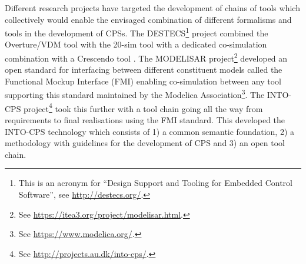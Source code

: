 Different research projects have targeted the development of chains of tools which collectively would enable the envisaged combination of different formalisms and tools in the development of CPSs. The DESTECS\footnote{This is an acronym for ``Design Support and Tooling for Embedded Control Software'', see \url{http://destecs.org/}.} project \cite{Broenink&10} combined the Overture/VDM tool \cite{Larsen&10a} with the 20-sim tool \cite{Kleijn06} with a dedicated co-simulation combination with a Crescendo tool \cite{Fitzgerald&14c}. The MODELISAR project\footnote{See \url{https://itea3.org/project/modelisar.html}.} developed an open standard for interfacing between different constituent models called the Functional Mockup Interface (FMI) enabling co-simulation between any tool supporting this standard maintained by the Modelica Association\footnote{See \url{https://www.modelica.org/}.}. The INTO-CPS project\footnote{See \url{http://projects.au.dk/into-cps/}.} took this further with a tool chain going all the way from requirements to final realisations using the FMI standard. This developed the INTO-CPS technology which consists of 1) a common semantic foundation, 2) a methodology with guidelines for the development of CPS and 3) an open tool chain.

